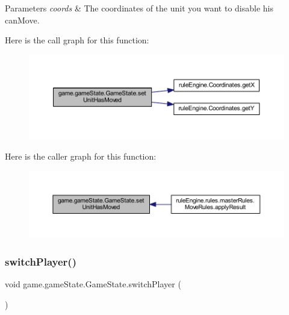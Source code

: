 \begin{DoxyParams}{Parameters}
{\em coords} & The coordinates of the unit you want to disable his can\+Move. \\
\hline
\end{DoxyParams}
Here is the call graph for this function\+:
\nopagebreak
\begin{figure}[H]
\begin{center}
\leavevmode
\includegraphics[width=350pt]{classgame_1_1game_state_1_1_game_state_adbe937aae18d5146f28e3cd181c54515_cgraph}
\end{center}
\end{figure}
Here is the caller graph for this function\+:
\nopagebreak
\begin{figure}[H]
\begin{center}
\leavevmode
\includegraphics[width=350pt]{classgame_1_1game_state_1_1_game_state_adbe937aae18d5146f28e3cd181c54515_icgraph}
\end{center}
\end{figure}
\mbox{\label{classgame_1_1game_state_1_1_game_state_a8c72ae2f7753681316a4a1d16e183b6e}} 
\subsubsection{\texorpdfstring{switch\+Player()}{switchPlayer()}}
{\footnotesize\ttfamily void game.\+game\+State.\+Game\+State.\+switch\+Player (\begin{DoxyParamCaption}{ }\end{DoxyParamCaption})\hspace{0.3cm}{\ttfamily [inline]}}

